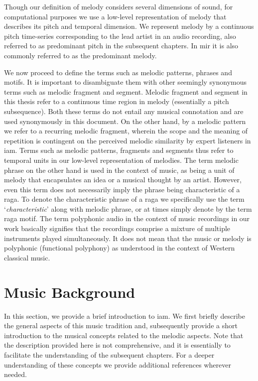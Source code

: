 Though our definition of melody considers several dimensions of sound, for computational purposes we use a low-level representation of melody that describes its pitch and temporal dimension. We represent melody by a continuous pitch time-series corresponding to the lead artist in an audio recording, also referred to as predominant pitch in the subsequent chapters. In \gls{mir} it is also commonly referred to as the predominant melody. 

We now proceed to define the terms such as melodic patterns, phrases and motifs. It is important to disambiguate them with other seemingly synonymous terms such as melodic fragment and segment. Melodic fragment and segment in this thesis refer to a continuous time region in melody (essentially a pitch subsequence). Both these terms do not entail any musical connotation and are used synonymously in this document. On the other hand, by a melodic pattern we refer to a recurring melodic fragment, wherein the scope and the meaning of repetition is contingent on the perceived melodic similarity by expert listeners in \gls{iam}. Terms such as melodic patterns, fragments and segments thus refer to temporal units in our low-level representation of melodies. The term melodic phrase on the other hand is used in the context of music, as being a unit of melody that encapsulates an idea or a musical thought by an artist. However, even this term does not necessarily imply the phrase being characteristic of a \gls{raga}. To denote the characteristic phrase of a \gls{raga} we specifically use the term `\textit{characteristic}' along with melodic phrase, or at times simply denote by the term \gls{raga} motif. The term polyphonic audio in the context of music recordings in our work basically signifies that the recordings comprise a mixture of multiple instruments played simultaneously. It does not mean that the music or melody is polyphonic (functional polyphony) as understood in the context of Western classical music.

\section{Music Background}
\label{sec:music_background}

In this section, we provide a brief introduction to \gls{iam}. We first briefly describe the general aspects of this music tradition and, subsequently provide a short introduction to the musical concepts related to the melodic aspects. Note that the description provided here is not comprehensive, and it is essentially to facilitate the understanding of the subsequent chapters. For a deeper understanding of these concepts we provide additional references wherever needed. 

